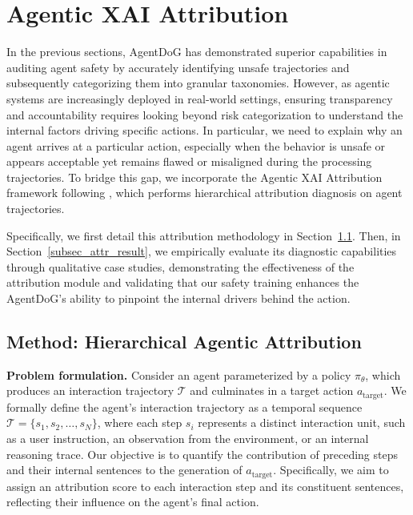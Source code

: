 \section{Agentic XAI Attribution}

In the previous sections, AgentDoG has demonstrated superior capabilities in auditing agent safety by accurately identifying unsafe trajectories and subsequently categorizing them into granular taxonomies.
However, as agentic systems are increasingly deployed in real-world settings, ensuring transparency and accountability requires looking beyond risk categorization to understand the internal factors driving specific actions. 
In particular, we need to explain why an agent arrives at a particular action, especially when the behavior is unsafe or appears acceptable yet remains flawed or misaligned during the processing trajectories.
To bridge this gap, we incorporate the Agentic XAI Attribution framework following \citep{qian2026behind}, which performs hierarchical attribution diagnosis on agent trajectories. 

Specifically, we first detail this attribution methodology in Section~\ref{subsec_atti_method}. 
Then, in Section~\ref{subsec_attr_result}, we empirically evaluate its diagnostic capabilities through qualitative case studies, demonstrating the effectiveness of the attribution module and validating that our safety training enhances the AgentDoG's ability to pinpoint the internal drivers behind the action.


\subsection{Method: Hierarchical Agentic Attribution}
\label{subsec_atti_method}
\textbf{Problem formulation.}
Consider an agent parameterized by a policy $\pi_\theta$, which produces an interaction trajectory $\mathcal{T}$ and culminates in a target action $a_{\text{target}}$. 
We formally define the agent's interaction trajectory as a temporal sequence $\mathcal{T} = \{s_1, s_2, \dots, s_N\}$, where each step $s_i$ represents a distinct interaction unit, such as a user instruction, an observation from the environment, or an internal reasoning trace.
Our objective is to quantify the contribution of preceding steps and their internal sentences to the generation of $a_{\text{target}}$. Specifically, we aim to assign an attribution score to each interaction step and its constituent sentences, reflecting their influence on the agent’s final action.


